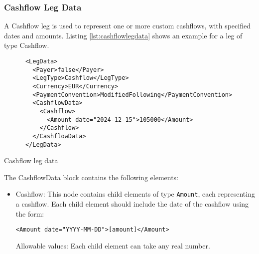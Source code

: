 \subsubsection{Cashflow Leg Data}
\label{ss:cashflowlegdata}

A Cashflow leg is used to represent one or more custom cashflows, with specified dates and amounts.
Listing \ref{lst:cashflowlegdata} shows an example for a leg of type Cashflow. 

\begin{listing}[H]
\begin{verbatim}
      <LegData>
        <Payer>false</Payer>
        <LegType>Cashflow</LegType>
        <Currency>EUR</Currency>
        <PaymentConvention>ModifiedFollowing</PaymentConvention>
        <CashflowData>
          <Cashflow>
            <Amount date="2024-12-15">105000</Amount>
          </Cashflow>
        </CashflowData>
      </LegData>
\end{verbatim}
\caption{Cashflow leg data}
\label{lst:cashflowlegdata}
\end{listing}

The CashflowData block contains the following elements:

\begin{itemize}
\item Cashflow: This node contains child elements of type \lstinline!Amount!, each representing a cashflow. Each child element should include the date of the cashflow using the form: 
\begin{verbatim}
<Amount date="YYYY-MM-DD">[amount]</Amount>
\end{verbatim}

Allowable values:  Each child element can take any real number. 

\end{itemize}
